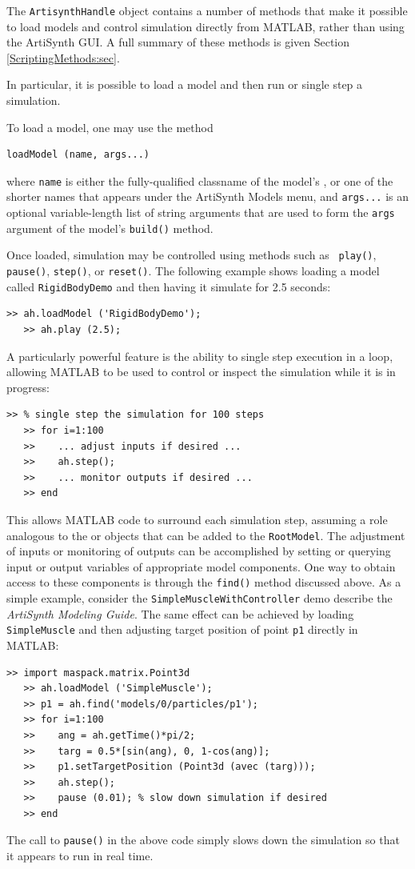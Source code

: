 \documentclass{article}
\begin{document}
The {\tt ArtisynthHandle} object contains a number of methods that
make it possible to load models and control simulation directly from
MATLAB, rather than using the ArtiSynth GUI. A full summary of these
methods is given Section \ref{ScriptingMethods:sec}.

In particular, it is possible to load a model and then run or single
step a simulation.

To load a model, one may use the method
%
\begin{lstlisting}[]
  loadModel (name, args...)
\end{lstlisting}
%
where {\tt name} is either the fully-qualified classname of the
model's 
,
or one of the shorter names that appears
under the ArtiSynth {\sf Models} menu, and {\tt args...} is an
optional variable-length list of string arguments that are used to
form the {\tt args} argument of the model's {\tt build()} method.

Once loaded, simulation may be controlled using methods such as {\tt
play()}, {\tt pause()}, {\tt step()}, or {\tt reset()}. The following
example shows loading a model called {\tt RigidBodyDemo} and
then having it simulate for 2.5 seconds:
%
\begin{lstlisting}[]
   >> ah.loadModel ('RigidBodyDemo');
   >> ah.play (2.5);
\end{lstlisting}
%
A particularly powerful feature is the ability to single step
execution in a loop, allowing MATLAB to be used to control or inspect
the simulation while it is in progress:
%
\begin{lstlisting}[]
   >> % single step the simulation for 100 steps
   >> for i=1:100
   >>    ... adjust inputs if desired ...
   >>    ah.step();
   >>    ... monitor outputs if desired ...
   >> end
\end{lstlisting}
%
This allows MATLAB code to surround each simulation step, assuming a
role analogous to the 
or  objects that can be
added to the {\tt RootModel}.  The adjustment of inputs or monitoring
of outputs can be accomplished by setting or querying input or output
variables of appropriate model components. One way to obtain access to
these components is through the {\tt find()} method discussed above.
As a simple example, consider the {\tt SimpleMuscleWithController}
demo describe the {\it ArtiSynth Modeling Guide}. The same effect
can be achieved by loading {\tt SimpleMuscle} and then adjusting
target position of point {\tt p1} directly in MATLAB:
%
\begin{lstlisting}[]
   >> import maspack.matrix.Point3d
   >> ah.loadModel ('SimpleMuscle');
   >> p1 = ah.find('models/0/particles/p1');
   >> for i=1:100
   >>    ang = ah.getTime()*pi/2;
   >>    targ = 0.5*[sin(ang), 0, 1-cos(ang)];
   >>    p1.setTargetPosition (Point3d (avec (targ)));
   >>    ah.step();
   >>    pause (0.01); % slow down simulation if desired
   >> end
\end{lstlisting}
%
The call to {\tt pause()} in the above code simply slows down the
simulation so that it appears to run in real time.
\end{document}

